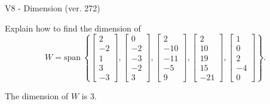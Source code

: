 \begin{exercise}
  \begin{exerciseTitle}V8 - Dimension (ver. 272)\end{exerciseTitle}
  \begin{exerciseStatement}
    Explain how to find the dimension of 
\[W=\mathrm{span}\ \left\{\left[\begin{array}{r}
2 \\
-2 \\
1 \\
3 \\
-3
\end{array}\right] , \left[\begin{array}{r}
0 \\
-2 \\
-3 \\
-2 \\
3
\end{array}\right] , \left[\begin{array}{r}
2 \\
-10 \\
-11 \\
-5 \\
9
\end{array}\right] , \left[\begin{array}{r}
2 \\
10 \\
19 \\
15 \\
-21
\end{array}\right] , \left[\begin{array}{r}
1 \\
0 \\
2 \\
-4 \\
0
\end{array}\right]\right\}.\]



  \end{exerciseStatement}
  \begin{exerciseAnswer}
   The dimension of \(W\) is  \(3\).
  


  \end{exerciseAnswer}
\end{exercise}